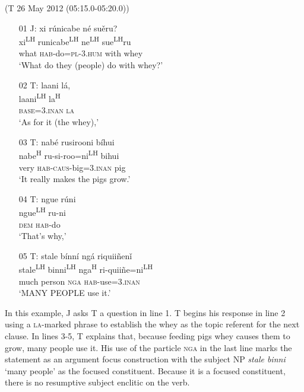 \ea\label{objectni}(T 26 May 2012 (05:15.0-05:20.0))
\begin{itemize}

\item[01 J:]
xi r\'{u}nicabe n\'{e} su\v{e}ru?  \\
xi\textsuperscript{LH} runicabe\textsuperscript{LH} ne\textsuperscript{LH} sue\textsuperscript{LH}ru  \\
what \textsc{hab}-do=\textsc{pl}-\textsc{3.hum} with whey  \\
\glt `What do they (people) do with whey?'


\item[02 T:]
\glll laani l\'{a},  \\
laani\textsuperscript{LH} la\textsuperscript{H}  \\
\textsc{base}=\textsc{3.inan} \textsc{la}  \\
\glt `As for it (the whey),'


\item[03 T:]
\glll nab\'{e} rusirooni b\'{i}hui  \\
nabe\textsuperscript{H} ru-si-roo=ni\textsuperscript{LH} bihui  \\
very \textsc{hab}-\textsc{caus}-big=\textsc{3.inan} pig  \\
\glt `It really makes the pigs grow.' 


\item[04 T:]
\glll ngue r\'{u}ni  \\
ngue\textsuperscript{LH} ru-ni  \\
\textsc{dem} \textsc{hab}-do  \\
\glt `That's why,'


\item[05 T:]
\glll stale b\'{i}nn\'{i} ng\'{a} riquii\~{n}en\v{i}  \\
stale\textsuperscript{LH} binni\textsuperscript{LH} nga\textsuperscript{H} ri-quii\~{n}e=ni\textsuperscript{LH}  \\
much person \textsc{nga} \textsc{hab}-use=\textsc{3.inan}  \\
\glt `MANY PEOPLE use it.' 


\end{itemize}
\z
In this example, J asks T a question in line 1. T begins his response in line 2 using a \textsc{la}-marked phrase to establish the whey as the topic referent for the next clause. In lines 3-5, T explains that, because feeding pigs whey causes them to grow, many people use it. His use of the particle \textsc{nga} in the last line marks the statement as an argument focus construction with the subject NP \textit{stale binni} `many people' as the focused constituent. Because it is a focused constituent, there is no resumptive subject enclitic on the verb. 

